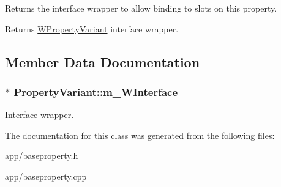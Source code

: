 Returns the interface wrapper to allow binding to slots on this property. 

\begin{DoxyReturn}{Returns}
\hyperlink{class_w_property_variant}{W\-Property\-Variant} interface wrapper. 
\end{DoxyReturn}


\subsection{Member Data Documentation}
\hypertarget{class_property_variant_a1e4df466c54f47349130ca4c3cb0bf93}{
\subsubsection[{m\-\_\-\-W\-Interface}]{$\ast$ Property\-Variant\-::m\-\_\-\-W\-Interface\hspace{0.3cm}{\ttfamily [protected]}}}\label{class_property_variant_a1e4df466c54f47349130ca4c3cb0bf93}
Interface wrapper. 

The documentation for this class was generated from the following files\-:\begin{DoxyCompactItemize}
\item 
app/\hyperlink{baseproperty_8h}{baseproperty.\-h}\item 
app/baseproperty.\-cpp\end{DoxyCompactItemize}
